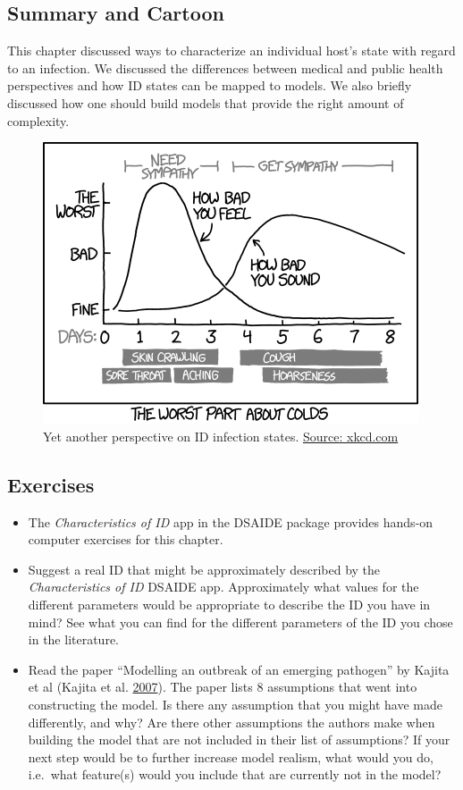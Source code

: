 \documentclass[]{article}
\providecommand{\tightlist}{%
  \setlength{\itemsep}{0pt}\setlength{\parskip}{0pt}}
\theoremstyle{definition}
\theoremstyle{definition}
\theoremstyle{definition}
\theoremstyle{remark}
\begin{document}
\subsection{Summary and Cartoon}\label{summary-and-cartoon-1}

This chapter discussed ways to characterize an individual host's state
with regard to an infection. We discussed the differences between
medical and public health perspectives and how ID states can be mapped
to models. We also briefly discussed how one should build models that
provide the right amount of complexity.

\begin{figure}
\centering
\includegraphics{./images/xkcd-course-of-colds.png}
\caption{Yet another perspective on ID infection states.
\href{https://xkcd.com/1612/}{Source: xkcd.com}}
\end{figure}

\subsection{Exercises}\label{exercises-1}

\begin{itemize}
\tightlist
\item
  The \emph{Characteristics of ID} app in the DSAIDE package provides
  hands-on computer exercises for this chapter.
\item
  Suggest a real ID that might be approximately described by the
  \emph{Characteristics of ID} DSAIDE app. Approximately what values for
  the different parameters would be appropriate to describe the ID you
  have in mind? See what you can find for the different parameters of
  the ID you chose in the literature.
\item
  Read the paper ``Modelling an outbreak of an emerging pathogen'' by
  Kajita et al (Kajita et al. \protect\hyperlink{ref-kajita07}{2007}).
  The paper lists 8 assumptions that went into constructing the model.
  Is there any assumption that you might have made differently, and why?
  Are there other assumptions the authors make when building the model
  that are not included in their list of assumptions? If your next step
  would be to further increase model realism, what would you do,
  i.e.~what feature(s) would you include that are currently not in the
  model?
\end{itemize}
\end{document}
